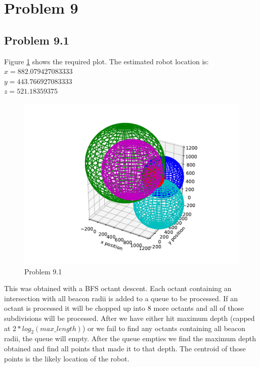 \documentclass{article}
\begin{document}
\newpage
\section{\textbf{Problem 9}}
\subsection{Problem 9.1}
Figure \ref{fig:9.1} shows the required plot. The estimated robot location is:\\
$x = 882.079427083333$\\
$y = 443.766927083333$\\
$z = 521.18359375$\\

\begin{figure}[h]
    \centering
    \includegraphics[pages=1]{problem9-1}
    \caption{Problem 9.1}
    \label{fig:9.1}
\end{figure}

This was obtained with a BFS octant descent. Each octant containing 
an intersection with all beacon radii is added to a queue to be processed. If 
an octant is processed it will be chopped up into 8 more octants and all of 
those subdivisions will be processed. After we have either hit maximum depth 
(capped at $2 * log_2(max\_length)$) or we fail to find any octants containing 
all beacon radii, the queue will empty. After the queue empties we find the 
maximum depth obtained and find all points that made it to that depth. The 
centroid of those points is the likely location of the robot. 
\end{document}
